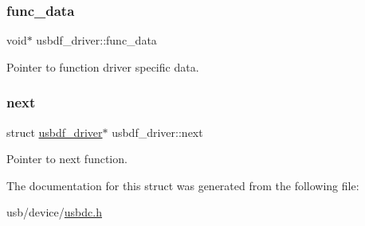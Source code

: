 \subsubsection{\texorpdfstring{func\+\_\+data}{func\_data}}
{\footnotesize\ttfamily void$\ast$ usbdf\+\_\+driver\+::func\+\_\+data}

Pointer to function driver specific data. \mbox{\label{structusbdf__driver_ad6c0a752bcfec6493f48bfcb9bdd0537}} 
\subsubsection{\texorpdfstring{next}{next}}
{\footnotesize\ttfamily struct \hyperlink{structusbdf__driver}{usbdf\+\_\+driver}$\ast$ usbdf\+\_\+driver\+::next}

Pointer to next function. 

The documentation for this struct was generated from the following file\+:\begin{DoxyCompactItemize}
\item 
usb/device/\hyperlink{usbdc_8h}{usbdc.\+h}\end{DoxyCompactItemize}
